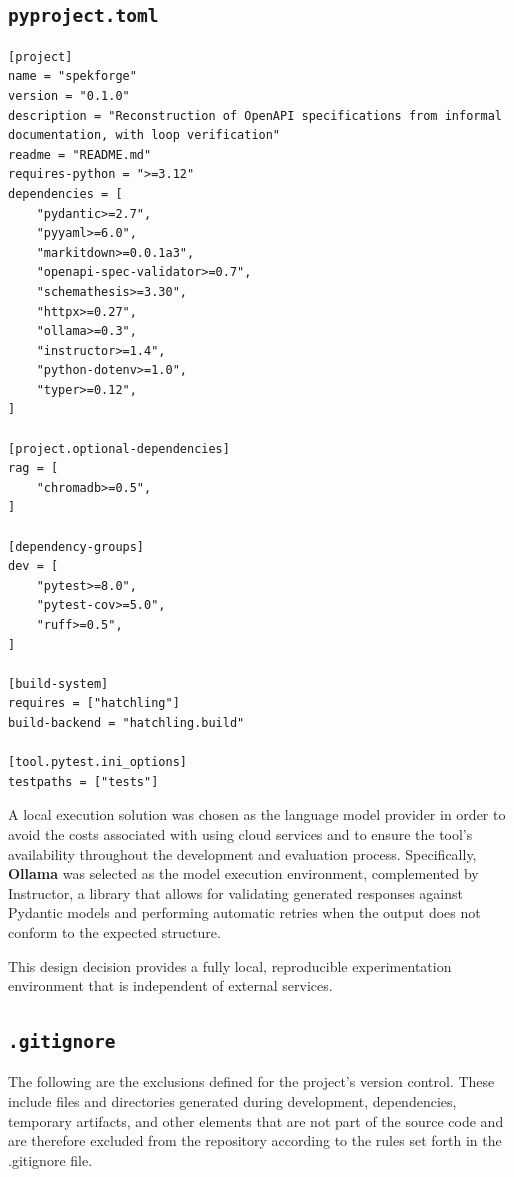 \subsection{\texttt{pyproject.toml}}
\begin{lstlisting}[language={[x86masm]Assembler}, basicstyle=\ttfamily\footnotesize, caption={Project dependencies and config}]
[project]
name = "spekforge"
version = "0.1.0"
description = "Reconstruction of OpenAPI specifications from informal documentation, with loop verification"
readme = "README.md"
requires-python = ">=3.12"
dependencies = [
    "pydantic>=2.7",
    "pyyaml>=6.0",
    "markitdown>=0.0.1a3",
    "openapi-spec-validator>=0.7",
    "schemathesis>=3.30",
    "httpx>=0.27",
    "ollama>=0.3",
    "instructor>=1.4",
    "python-dotenv>=1.0",
    "typer>=0.12",
]

[project.optional-dependencies]
rag = [
    "chromadb>=0.5",
]

[dependency-groups]
dev = [
    "pytest>=8.0",
    "pytest-cov>=5.0",
    "ruff>=0.5",
]

[build-system]
requires = ["hatchling"]
build-backend = "hatchling.build"

[tool.pytest.ini_options]
testpaths = ["tests"]
\end{lstlisting}

A local execution solution was chosen as the language model provider 
in order to avoid the costs associated with using cloud services 
and to ensure the tool’s availability throughout the development 
and evaluation process. Specifically, \textbf{Ollama} was selected
as the model execution environment, complemented by Instructor, 
a library that allows for validating generated responses against 
Pydantic models and performing automatic retries when the output 
does not conform to the expected structure.

This design decision provides a fully local, reproducible experimentation 
environment that is independent of external services.

\subsection{\texttt{.gitignore}}
The following are the exclusions defined for the project's version 
control. These include files and directories generated during 
development, dependencies, temporary artifacts, and other elements 
that are not part of the source code and are therefore excluded 
from the repository according to the rules set forth 
in the .gitignore file.

